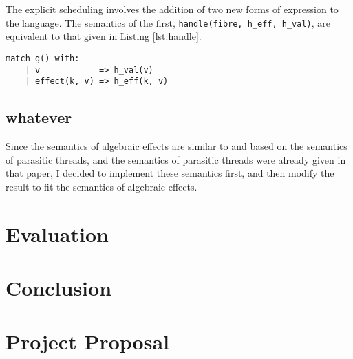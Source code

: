 \documentclass[12pt,a4paper,twoside,openright]{report}
\begin{document}
The explicit scheduling involves the addition of two new forms of expression to the language. The semantics of the first, \texttt{handle(fibre, h\_eff, h\_val)}, are equivalent to that given in Listing \ref{lst:handle}.

\begin{lstlisting}[caption=The semantics of \texttt{handle},label={lst:handle}]
  match g() with:
    | v            => h_val(v)
    | effect(k, v) => h_eff(k, v)
\end{lstlisting}

\section{whatever}

Since the semantics of algebraic effects are similar to and based on the semantics of parasitic threads, and the semantics of parasitic threads were already given in that paper, I decided to implement these semantics first, and then modify the result to fit the semantics of algebraic effects.



\chapter{Evaluation}

\chapter{Conclusion}


\appendix

\chapter{Project Proposal}
\end{document}

